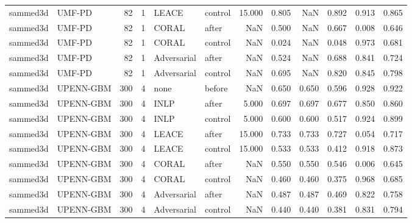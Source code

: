 \begin{tabular}{llrrllrrrrrr}
sammed3d & UMF-PD & 82 & 1 & LEACE & control & 15.000 & 0.805 & NaN & 0.892 & 0.913 & 0.865 \\
sammed3d & UMF-PD & 82 & 1 & CORAL & after & NaN & 0.500 & NaN & 0.667 & 0.008 & 0.646 \\
sammed3d & UMF-PD & 82 & 1 & CORAL & control & NaN & 0.024 & NaN & 0.048 & 0.973 & 0.681 \\
sammed3d & UMF-PD & 82 & 1 & Adversarial & after & NaN & 0.524 & NaN & 0.688 & 0.841 & 0.724 \\
sammed3d & UMF-PD & 82 & 1 & Adversarial & control & NaN & 0.695 & NaN & 0.820 & 0.845 & 0.798 \\
sammed3d & UPENN-GBM & 300 & 4 & none & before & NaN & 0.650 & 0.650 & 0.596 & 0.928 & 0.922 \\
sammed3d & UPENN-GBM & 300 & 4 & INLP & after & 5.000 & 0.697 & 0.697 & 0.677 & 0.850 & 0.860 \\
sammed3d & UPENN-GBM & 300 & 4 & INLP & control & 5.000 & 0.600 & 0.600 & 0.517 & 0.924 & 0.899 \\
sammed3d & UPENN-GBM & 300 & 4 & LEACE & after & 15.000 & 0.733 & 0.733 & 0.727 & 0.054 & 0.717 \\
sammed3d & UPENN-GBM & 300 & 4 & LEACE & control & 15.000 & 0.533 & 0.533 & 0.412 & 0.918 & 0.873 \\
sammed3d & UPENN-GBM & 300 & 4 & CORAL & after & NaN & 0.550 & 0.550 & 0.546 & 0.006 & 0.645 \\
sammed3d & UPENN-GBM & 300 & 4 & CORAL & control & NaN & 0.460 & 0.460 & 0.375 & 0.968 & 0.685 \\
sammed3d & UPENN-GBM & 300 & 4 & Adversarial & after & NaN & 0.487 & 0.487 & 0.469 & 0.822 & 0.758 \\
sammed3d & UPENN-GBM & 300 & 4 & Adversarial & control & NaN & 0.440 & 0.440 & 0.381 & 0.831 & 0.794 \\
\bottomrule
\end{tabular}
